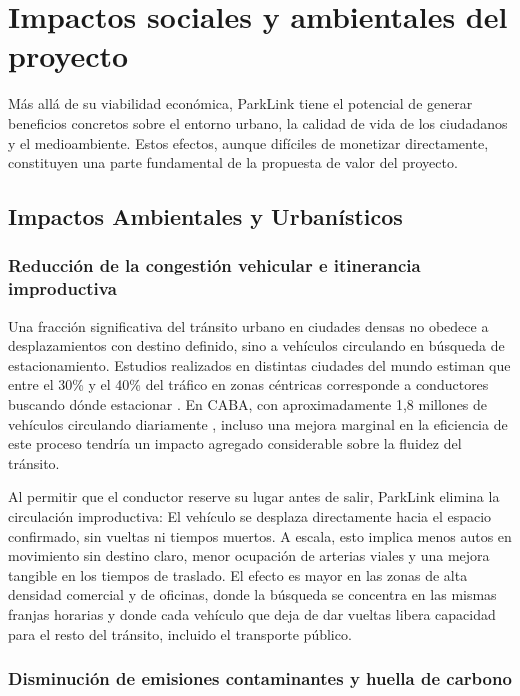 \section{Impactos sociales y ambientales del proyecto}\label{sec:impactos}

Más allá de su viabilidad económica, ParkLink tiene el potencial de generar beneficios concretos sobre el entorno urbano, la calidad de vida de los ciudadanos y el medioambiente. Estos efectos, aunque difíciles de monetizar directamente, constituyen una parte fundamental de la propuesta de valor del proyecto.

\subsection{Impactos Ambientales y Urbanísticos}

\subsubsection{Reducción de la congestión vehicular e itinerancia improductiva}

Una fracción significativa del tránsito urbano en ciudades densas no obedece a desplazamientos con destino definido, sino a vehículos circulando en búsqueda de estacionamiento. Estudios realizados en distintas ciudades del mundo estiman que entre el 30\% y el 40\% del tráfico en zonas céntricas corresponde a conductores buscando dónde estacionar \autocite{shoup2006, shoup2005}. En CABA, con aproximadamente 1,8 millones de vehículos circulando diariamente \autocite{superauto2024, aboy2025movilidad}, incluso una mejora marginal en la eficiencia de este proceso tendría un impacto agregado considerable sobre la fluidez del tránsito.

Al permitir que el conductor reserve su lugar antes de salir, ParkLink elimina la circulación improductiva: El vehículo se desplaza directamente hacia el espacio confirmado, sin vueltas ni tiempos muertos. A escala, esto implica menos autos en movimiento sin destino claro, menor ocupación de arterias viales y una mejora tangible en los tiempos de traslado. El efecto es mayor en las zonas de alta densidad comercial y de oficinas, donde la búsqueda se concentra en las mismas franjas horarias y donde cada vehículo que deja de dar vueltas libera capacidad para el resto del tránsito, incluido el transporte público.

\subsubsection{Disminución de emisiones contaminantes y huella de carbono}

